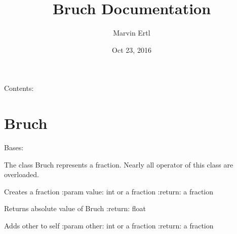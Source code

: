\documentclass[letterpaper,10pt,english]{sphinxmanual}
\title{Bruch Documentation}
\date{Oct 23, 2016}
\author{Marvin Ertl}
\begin{document}
\maketitle
\tableofcontents
{}\label{index::doc}


Contents:


\chapter{Bruch}
\label{bruch:welcome-to-bruch-s-documentation}\label{bruch:module-bruch}\label{bruch::doc}\label{bruch:bruch}

\begin{fulllineitems}
\label{bruch:bruch.Bruch}
Bases: 

The class Bruch represents a fraction.
Nearly all operator of this class are overloaded.

\begin{fulllineitems}
\label{bruch:bruch.Bruch._Bruch__makeBruch}
Creates a fraction
:param value: int or a fraction
:return: a fraction

\end{fulllineitems}


\begin{fulllineitems}
\label{bruch:bruch.Bruch.__abs__}
Returns absolute value of Bruch
:return: float

\end{fulllineitems}


\begin{fulllineitems}
\label{bruch:bruch.Bruch.__add__}
Adds other to self
:param other: int or a fraction
:return: a fraction

\end{fulllineitems}



\end{fulllineitems}
\end{document}
